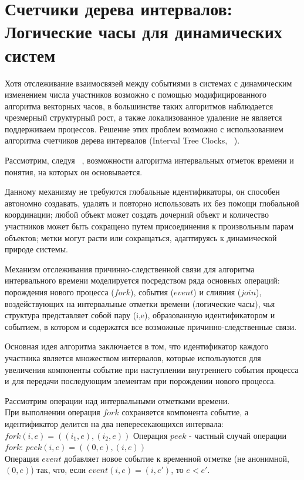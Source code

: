 \section{Счетчики дерева интервалов: Логические часы для динамических систем}
Хотя отслеживание взаимосвязей между событиями в системах с динамическим изменением числа участников возможно с помощью модифицированного алгоритма векторных часов, в большинстве таких алгоритмов наблюдается чрезмерный структурный рост, а также локализованное удаление не является поддерживаем процессов. Решение этих проблем возможно с использованием алгоритма счетчиков дерева интервалов (Interval Tree Clocks, ~\cite{itc_article}).\par
Рассмотрим, следуя ~\cite{itc_article}, возможности алгоритма интервальных отметок времени и понятия, на которых он основывается.\par
Данному механизму не требуются глобальные идентификаторы, он способен автономно создавать, удалять и повторно использовать их без помощи глобальной координации; любой объект может создать дочерний объект и количество участников может быть сокращено путем присоединения к произвольным парам объектов; метки могут расти или сокращаться, адаптируясь к динамической природе системы.\par
Механизм отслеживания причинно-следственной связи для алгоритма интервального времени моделируется посредством ряда основных операций: порождения нового процесса ($fork$), события ($event$) и слияния ($join$), воздействующих на интервальные отметки времени (логические часы), чья структура представляет собой пару (i,e), образованную идентификатором и событием, в котором и содержатся все возможные причинно-следственные связи.\par
Основная идея алгоритма заключается в том, что идентификатор каждого участника является множеством интервалов, которые используются для увеличения компоненты событие при наступлении внутреннего события процесса и для передачи последующим элементам при порождении нового процесса.\par 
Рассмотрим операции над интервальными отметками времени.\\
При выполнении операция $fork$ сохраняется компонента событие, а идентификатор делится на два непересекающихся интервала: $fork(i,e) = ((i_1,e),(i_2,e))$  
Операция $peek$ - частный случай операции $fork$: $peek(i,e)=((0,e),(i,e))$\\
Операция $event$ добавляет новое событие к временной отметке (не анонимной, $(0,e)$) так, что, если $event(i,e) = (i,e')$, то $e < e'$. 
